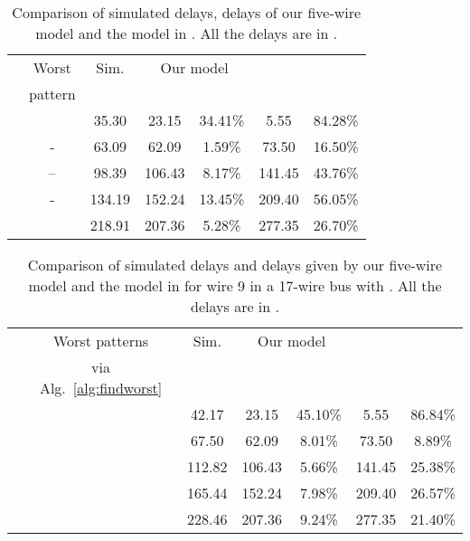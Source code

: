 \documentclass[10pt,journal]{IEEEtran}
\begin{document}
\begin{table}
\caption{Comparison of simulated delays, delays of our five-wire model and the model in \cite{Sot01}. All the delays are in .}\label{tab:2}
\begin{center}
\begin{tabular}{|r|c|c|c|c|c|c|}
\hline
\multirow{2}{*}{}& Worst & Sim. & \multicolumn{2}{|c|}{Our model} & \multicolumn{2}{|c|}{\cite{Sot01}}\\
\cline{3-7} & pattern &  &  &  &  &  \\
\hline
 &  & 35.30 & 23.15 & 34.41\% & 5.55 & 84.28\%\\
\hline
 & - & 63.09 & 62.09 & 1.59\% & 73.50  & 16.50\%\\
\hline
 & -- & 98.39 & 106.43 &  8.17\% & 141.45 & 43.76\%\\
\hline
 & - & 134.19 & 152.24 &  13.45\% & 209.40 & 56.05\%\\
\hline
 &  & 218.91 & 207.36 & 5.28\% & 277.35  & 26.70\%\\
\hline
\end{tabular}
\end{center}
\end{table}





\begin{table*}
\caption{Comparison of simulated delays and delays given by our five-wire model and the model in \cite{Sot01} for wire 9 in a 17-wire bus with  . All the delays are in .}\label{tab:5}
\begin{center}
\begin{tabular}{|c|c|c|c|c|c|c|}
\hline
\multirow{3}{*}{} & Worst patterns & Sim. & \multicolumn{2}{c|}{Our model} & \multicolumn{2}{c|}{\cite{Sot01}} \\
\cline{3-7}
& via Alg.~\ref{alg:findworst} &  &  &  &  &   \\
\hline
 &  & 42.17 &  23.15 & 45.10\% &  5.55  & 86.84\% \\
\hline
 &  & 67.50 & 62.09 & 8.01\% & 73.50  & 8.89\% \\
\hline
 &  & 112.82 & 106.43 &  5.66\% & 141.45 & 25.38\% \\
\hline
 &  & 165.44 & 152.24 &  7.98\% & 209.40 & 26.57\% \\
\hline
 &  & 228.46 & 207.36 & 9.24\% & 277.35  & 21.40\% \\
\hline
\end{tabular}
\end{center}
\end{table*}
\end{document}
